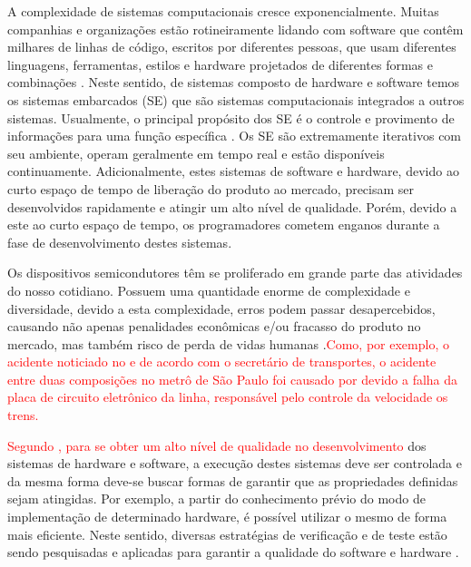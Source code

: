 A complexidade de sistemas computacionais cresce exponencialmente. Muitas companhias e organizações estão rotineiramente lidando com software que contêm milhares de linhas de código, escritos por diferentes pessoas, que usam diferentes linguagens, ferramentas, estilos e hardware projetados de diferentes formas e combinações \cite{hoder2011case}. Neste sentido, de sistemas composto de hardware e software temos os sistemas embarcados (SE) que são sistemas computacionais integrados a outros sistemas. Usualmente, o principal propósito dos SE é o controle e provimento de informações para uma função específica \cite{ramesh2012energy}. Os SE são extremamente iterativos com seu ambiente, operam geralmente em tempo real e estão disponíveis continuamente. Adicionalmente, estes sistemas de software e hardware, devido ao curto espaço de tempo de liberação do produto ao mercado, precisam ser desenvolvidos rapidamente e atingir um alto nível de qualidade. Porém, devido a este ao curto espaço de tempo, os programadores cometem enganos durante a fase de desenvolvimento destes sistemas.

\par
Os dispositivos semicondutores têm se proliferado em grande parte das atividades do nosso cotidiano. Possuem uma quantidade enorme de complexidade e diversidade, devido a esta complexidade, erros podem passar desapercebidos, causando não apenas penalidades econômicas e/ou fracasso do produto no mercado, mas também risco de perda de vidas humanas \cite{cabodi2016hardware}.\textcolor{red}{Como, por exemplo, o acidente noticiado no \cite{g1Acidente} e de acordo com o secretário de transportes, o acidente entre duas composições no metrô de São Paulo foi causado por devido a falha da placa de circuito eletrônico da linha, responsável pelo controle da velocidade os trens.}

\par
\textcolor{red}{Segundo \cite{rocha2015verificaccao}, para se obter um alto nível de qualidade no desenvolvimento} dos sistemas de hardware e software, a execução destes sistemas deve ser controlada e da mesma forma deve-se buscar formas de garantir que as propriedades definidas sejam atingidas. Por exemplo, a partir do conhecimento prévio do modo de implementação de determinado hardware, é possível utilizar o mesmo de forma mais eficiente. Neste sentido, diversas estratégias de verificação e de teste estão sendo pesquisadas e aplicadas para garantir a qualidade do software e hardware \cite{hoder2010interpolation,rocha2010exploiting,brayton2010abc,cordeiro2012smt,cabodi2016hardware}.


